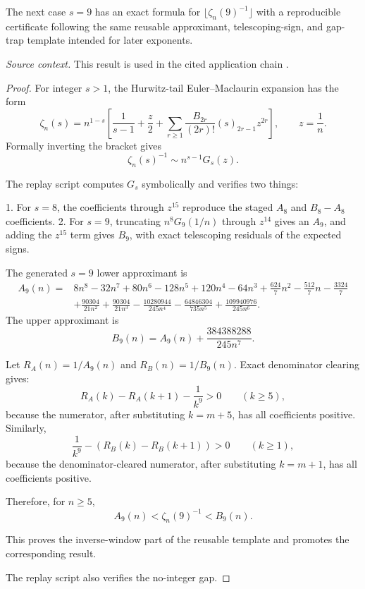 \begin{proposition}
\label{res:zeta-tail-s9-reusable-certificate}
The next case \(s=9\) has an exact formula for \(\lfloor\zeta_n(9)^{-1}\rfloor\) with a reproducible certificate following the same reusable approximant, telescoping-sign, and gap-trap template intended for later exponents.

\emph{Source context.} This result is used in the cited application chain \cite{kim-song-tail}.
\end{proposition}
\begin{proof}
For integer \(s>1\), the Hurwitz-tail Euler--Maclaurin expansion has the form
\[
\zeta_n(s)
=n^{1-s}\left[
\frac1{s-1}+\frac{z}{2}
+\sum_{r\ge1}\frac{B_{2r}}{(2r)!}(s)_{2r-1}z^{2r}
\right],
\qquad z=\frac1n.
\]
Formally inverting the bracket gives
\[
\zeta_n(s)^{-1}\sim n^{s-1}G_s(z).
\]

The replay script
computes \(G_s\) symbolically and verifies two things:

1. For \(s=8\), the coefficients through \(z^{15}\) reproduce the staged \(A_8\) and \(B_8-A_8\) coefficients.
2. For \(s=9\), truncating \(n^8G_9(1/n)\) through \(z^{14}\) gives an \(A_9\), and adding the \(z^{15}\) term gives \(B_9\), with exact telescoping residuals of the expected signs.

The generated \(s=9\) lower approximant is
\[
\begin{aligned}
A_9(n)=&8n^8-32n^7+80n^6-128n^5+120n^4-64n^3
+\frac{624}{7}n^2-\frac{512}{7}n-\frac{3324}{7}\\
&+\frac{90304}{21n^2}+\frac{90304}{21n^3}
-\frac{10280944}{245n^4}-\frac{64846304}{735n^5}
+\frac{109940976}{245n^6}.
\end{aligned}
\]
The upper approximant is
\[
B_9(n)=A_9(n)+\frac{384388288}{245n^7}.
\]

Let \(R_A(n)=1/A_9(n)\) and \(R_B(n)=1/B_9(n)\). Exact denominator clearing gives:
\[
R_A(k)-R_A(k+1)-\frac1{k^9}>0
\qquad(k\ge5),
\]
because the numerator, after substituting \(k=m+5\), has all coefficients positive. Similarly,
\[
\frac1{k^9}-\left(R_B(k)-R_B(k+1)\right)>0
\qquad(k\ge1),
\]
because the denominator-cleared numerator, after substituting \(k=m+1\), has all coefficients positive.

Therefore, for \(n\ge5\),
\[
A_9(n)<\zeta_n(9)^{-1}<B_9(n).
\]

This proves the inverse-window part of the reusable template and promotes the corresponding result.

The replay script also verifies the no-integer gap.


\end{proof}

